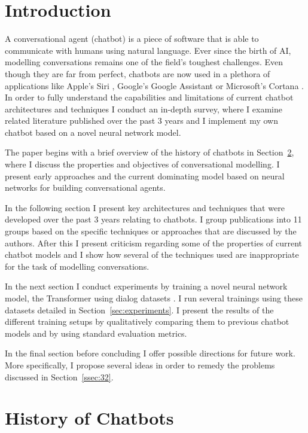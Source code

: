 \documentclass[12pt]{article}
\begin{document}
\newpage\tableofcontents
\newpage\section{Introduction} \label{sec:intro}

A conversational agent (chatbot) is a piece of software that is able to communicate with humans using natural language. Ever since the birth of AI, modelling conversations remains one of the field's toughest challenges. Even though they are far from perfect, chatbots are now used in a plethora of applications like Apple's Siri \cite{Siri:2017}, Google's Google Assistant \cite{Google:2017} or Microsoft's Cortana \cite{Cortana:2017}. In order to fully understand the capabilities and limitations of current chatbot architectures and techniques I conduct an in-depth survey, where I examine related literature published over the past 3 years and I implement my own chatbot based on a novel neural network model. 

The paper begins with a brief overview of the history of chatbots in Section~\ref{sec:history}, where I discuss the properties and objectives of conversational modelling. I present early approaches and the current dominating model based on neural networks for building conversational agents.

In the following section I present key architectures and techniques that were developed over the past 3 years relating to chatbots. I group publications into 11 groups based on the specific techniques or approaches that are discussed by the authors. After this I present criticism regarding some of the properties of current chatbot models and I show how several of the techniques used are inappropriate for the task of modelling conversations.

In the next section I conduct experiments by training a novel neural network model, the Transformer \cite{Vaswani:2017} using dialog datasets \cite{Danescu:2011,Tiedemann:2009}. I run several trainings using these datasets detailed in Section~\ref{sec:experiments}. I present the results of the different training setups by qualitatively comparing them to previous chatbot models and by using standard evaluation metrics.

In the final section before concluding I offer possible directions for future work. More specifically, I propose several ideas in order to remedy the problems discussed in Section~\ref{ssec:32}.

\newpage\section{History of Chatbots} \label{sec:history}
\end{document}
